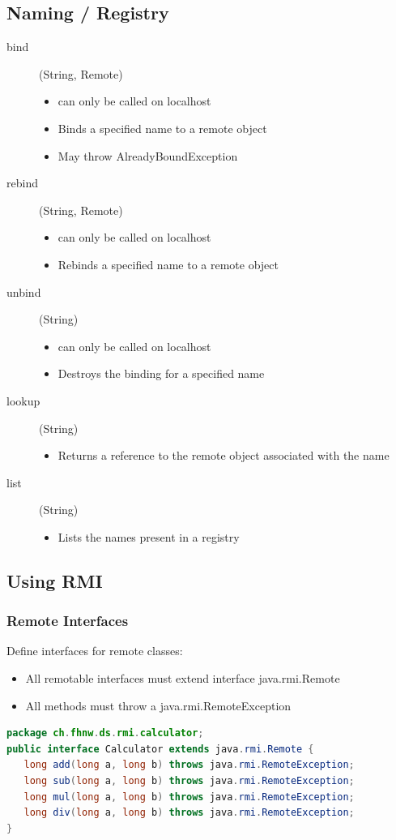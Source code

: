 \documentclass[10pt]{article}
\begin{document}
\subsection{Naming / Registry}
\begin{description}
	\item[bind] (String, Remote)\hfill 
		\begin{itemize}
			\item {\color{red} can only be called on localhost}
			\item Binds a specified name to a remote object
			\item May throw AlreadyBoundException
		\end{itemize}
	\item[rebind] (String, Remote)\hfill 
		\begin{itemize}
			\item {\color{red} can only be called on localhost}
			\item Rebinds a specified name to a remote object
		\end{itemize}
	\item[unbind] (String)\hfill 
		\begin{itemize}
			\item {\color{red} can only be called on localhost}
			\item Destroys the binding for a specified name
		\end{itemize}
	\item[lookup] (String)\hfill 
		\begin{itemize}
			\item Returns a reference to the remote object associated with the name
		\end{itemize}
	\item[list] (String)\hfill 
		\begin{itemize}
			\item Lists the names present in a registry
		\end{itemize}
\end{description}
\subsection{Using RMI}
\subsubsection{Remote Interfaces}
Define interfaces for remote classes:
\begin{itemize}
	\item All remotable interfaces must extend interface java.rmi.Remote
	\item All methods must throw a java.rmi.RemoteException
\end{itemize}
\begin{lstlisting}[language=Java, caption=Remote Interfaces, style=JavaStyle]
package ch.fhnw.ds.rmi.calculator;
public interface Calculator extends java.rmi.Remote {
   long add(long a, long b) throws java.rmi.RemoteException;
   long sub(long a, long b) throws java.rmi.RemoteException;
   long mul(long a, long b) throws java.rmi.RemoteException;
   long div(long a, long b) throws java.rmi.RemoteException;
}
\end{lstlisting}
\end{document}
